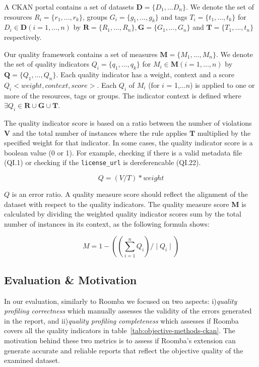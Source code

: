 \documentclass[onecolumn, crcready]{../../Tools/LaTEX/iosart2c}
\begin{document}
A CKAN portal contains a set of datasets $\textbf{D} = \{D_1,...D_n\}$. We denote the set of resources $R_i = \{r_1,...,r_k\}$, groups $G_i = \{g_1,...,g_k\}$ and tags $T_i = \{t_1,...,t_k\}$ for $D_i \in \textbf{D} (i=1,...,n)$ by $  \textbf{R}=\{R_1,...,R_n\}, \textbf{G}=\{G_1,...,G_n\}$ and $\textbf{T}=\{T_1,...,t_n\}$ respectively.

Our quality framework contains a set of measures $\textbf{M} = \{M_1,...,M_n\}$. We denote the set of quality indicators $Q_i = \{q_1,...,q_k\}$ for $M_i \in \textbf{M} (i=1,...,n)$ by $\textbf{Q} = \{Q_1,...,Q_n\}$. Each quality indicator has a weight, context and a score $Q_i<weight, context, score>$. Each $Q_i$ of $M_i$ (for $i$ = 1,...$n$) is applied to one or more of the resources, tags or groups. The indicator context is defined where $\exists Q_i \in \textbf{R} \cup \textbf{G} \cup \textbf{T}$.

The quality indicator score is based on a ratio between the number of violations $\textbf{V}$ and the total number of instances where the rule applies $\textbf{T}$ multiplied by the specified weight for that indicator. In some cases, the quality indicator score is a boolean value (0 or 1). For example, checking if there is a valid metadata file (QI.1) or checking if the \texttt{license\_url} is dereferencable (QI.22).

\begin{equation}
 Q = (V/T) * weight
\end{equation}

$Q$ is an error ratio. A quality measure score should reflect the alignment of the dataset with respect to the quality indicators. The quality measure score \textbf{M} is calculated by dividing the weighted quality indicator scores sum by the total number of instances in its context, as the following formula shows:

\begin{equation}
 M =  1 - ((\sum_{i=1}^{n} Q_{i}) / \mid Q_{i} \mid )
\end{equation}

\subsection{Evaluation \& Motivation}

In our evaluation, similarly to Roomba we focused on two aspects: i)\textit{quality profiling correctness} which manually assesses the validity of the errors generated in the report, and ii)\textit{quality profiling completeness} which assesses if Roomba covers all the quality indicators in table~\ref{tab:objective-methods-ckan}. The motivation behind these two metrics is to assess if Roomba's extension can generate accurate and reliable reports that reflect the objective quality of the examined dataset.
\end{document}
